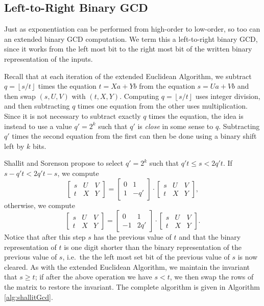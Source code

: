 \documentclass{ucalgthes1}
\theoremstyle{definition}
\newcommand{\matrixtt}[4]{\left[ \begin{array}{rr} #1 & #2 \\ #3 & #4 \end{array} \right]}
\newcommand{\matrixThreeTwo}[6]{\left[ \begin{array}{rrr} #1 & #2 & #3 \\ #4 & #5 & #6 \end{array} \right]}
\newcommand{\floor}[1]{\left\lfloor #1 \right\rfloor}
\begin{document}
\subsection{Left-to-Right Binary GCD}

Just as exponentiation can be performed from high-order to low-order, so too can an extended binary GCD computation.  We term this a left-to-right binary GCD, since it works from the left most bit to the right most bit of the written binary representation of the inputs.

Recall that at each iteration of the extended Euclidean Algorithm, we subtract $q = \floor{s/t}$ times the equation $t = Xa + Yb$ from the equation $s = Ua + Vb$ and then swap $(s, U, V)$ with $(t, X, Y)$.  Computing $q=\floor{s/t}$ uses integer division, and then subtracting $q$ times one equation from the other uses multiplication.  Since it is not necessary to subtract exactly $q$ times the equation, the idea is instead to use a value $q' = 2^k$ such that $q'$ is \emph{close} in some sense to $q$.  Subtracting $q'$ times the second equation from the first can then be done using a binary shift left by $k$ bits.

Shallit and Sorenson \cite{Shallit1994} propose to select $q'=2^k$ such that $q't \le s < 2q't$.  If $s - q't < 2q't - s$, we compute
\[
	\matrixThreeTwo{s}{U}{V}{t}{X}{Y} =
		\matrixtt{0}{1}{1}{-q'} \cdot \matrixThreeTwo{s}{U}{V}{t}{X}{Y},
\]
otherwise, we compute
\[
	\matrixThreeTwo{s}{U}{V}{t}{X}{Y} =
		\matrixtt{0}{1}{-1}{2q'} \cdot \matrixThreeTwo{s}{U}{V}{t}{X}{Y}.
\]
Notice that after this step $s$ has the previous value of $t$ and that the binary representation of $t$ is one digit shorter than the binary representation of the previous value of $s$, i.e.\ the the left most set bit of the previous value of $s$ is now cleared.  As with the extended Euclidean Algorithm, we maintain the invariant that $s \ge t$; if after the above operation we have $s < t$, we then swap the rows of the matrix to restore the invariant. The complete algorithm is given in Algorithm \ref{alg:shallitGcd}.
\end{document}
